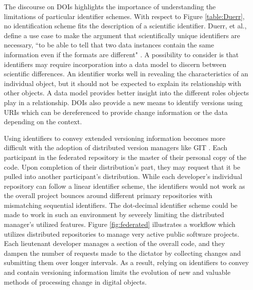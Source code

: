 The discourse on DOIs highlights the importance of understanding the limitations of particular identifier schemes.
With respect to Figure \ref{table:Duerr}, no identification scheme fits the description of a scientific identifier.
Duerr, et al., define a use case to make the argument that scientifically unique identifiers are necessary, ``to be able to tell that two data instances contain the same information even if the formats are different" \cite{Duerr2011}.
A possibility to consider is that identifiers may require incorporation into a data model to discern between scientific differences.
An identifier works well in revealing the characteristics of an individual object, but it should not be expected to explain its relationship with other objects.
A data model provides better insight into the different roles objects play in a relationship.
DOIs also provide a new means to identify versions using URIs which can be dereferenced to provide change information or the data depending on the context.

Using identifiers to convey extended versioning information becomes more difficult with the adoption of distributed version managers like GIT \cite{cederqvist2002version}.
Each participant in the federated repository is the master of their personal copy of the code.
Upon completion of their distribution's part, they may request that it be pulled into another participant's distribution.
While each developer's individual repository can follow a linear identifier scheme, the identifiers would not work as the overall project bounces around different primary repositories with mismatching sequential identifiers.
The dot-decimal identifier scheme could be made to work in such an environment by severely limiting the distributed manager's utilized features.
Figure \ref{fig:federated} illustrates a workflow which utilizes distributed repositories to manage very active public software projects.
Each lieutenant developer manages a section of the overall code, and they dampen the number of requests made to the dictator by collecting changes and submitting them over longer intervals.
As a result, relying on identifiers to convey and contain versioning information limits the evolution of new and valuable methods of processing change in digital objects.

